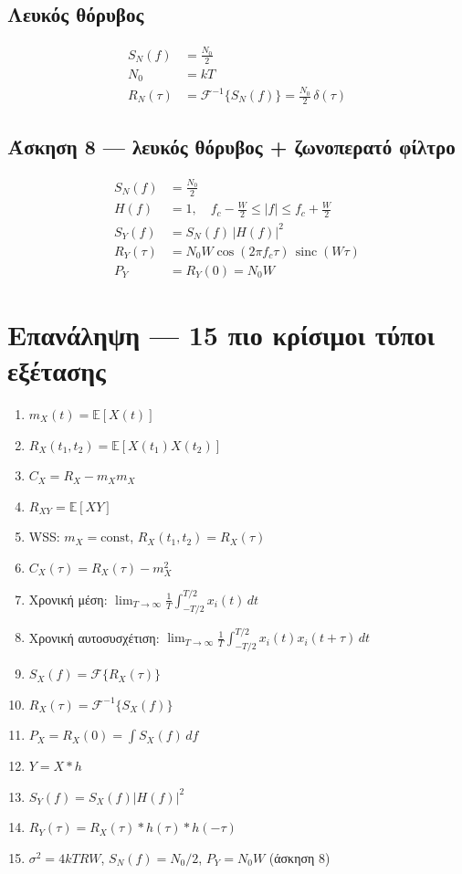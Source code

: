 \documentclass[11pt,a4paper]{article}
\newcommand{\F}{\mathcal{F}}
\newcommand{\sinc}{\operatorname{sinc}}
\newcommand{\E}{\mathbb{E}}
\begin{document}
\subsection{Λευκός θόρυβος}
\begin{align}
S_N(f) &= \frac{N_0}{2} \\
N_0 &= kT \\
R_N(\tau) &= \F^{-1}\{S_N(f)\} = \frac{N_0}{2}\,\delta(\tau)
\end{align}

\subsection{Άσκηση 8 — λευκός θόρυβος + ζωνοπερατό φίλτρο}
\begin{align}
S_N(f) &= \frac{N_0}{2} \\
H(f) &= 1, \quad f_c - \frac{W}{2} \le |f| \le f_c + \frac{W}{2} \\
S_Y(f) &= S_N(f)\,|H(f)|^2 \\
R_Y(\tau) &= N_0 W \cos(2\pi f_c \tau)\,\sinc(W\tau) \\
P_Y &= R_Y(0) = N_0 W
\end{align}

\section{Επανάληψη — 15 πιο κρίσιμοι τύποι εξέτασης}
\begin{enumerate}[leftmargin=*]
\item $m_X(t) = \E[X(t)]$
\item $R_X(t_1,t_2) = \E[X(t_1)X(t_2)]$
\item $C_X = R_X - m_X m_X$
\item $R_{XY} = \E[XY]$
\item WSS: $m_X = \text{const}$, $R_X(t_1,t_2) = R_X(\tau)$
\item $C_X(\tau) = R_X(\tau) - m_X^2$
\item Χρονική μέση: $\displaystyle \lim_{T\to\infty}\frac{1}{T}\int_{-T/2}^{T/2} x_i(t)\,dt$
\item Χρονική αυτοσυσχέτιση: $\displaystyle \lim_{T\to\infty}\frac{1}{T}\int_{-T/2}^{T/2} x_i(t)x_i(t+\tau)\,dt$
\item $S_X(f) = \F\{R_X(\tau)\}$
\item $R_X(\tau) = \F^{-1}\{S_X(f)\}$
\item $P_X = R_X(0) = \int S_X(f)\,df$
\item $Y = X \ast h$
\item $S_Y(f) = S_X(f)|H(f)|^2$
\item $R_Y(\tau) = R_X(\tau)\ast h(\tau)\ast h(-\tau)$
\item $\sigma^2 = 4kTRW$, \quad $S_N(f) = N_0/2$, \quad $P_Y = N_0 W$ (άσκηση 8)
\end{enumerate}
\end{document}
